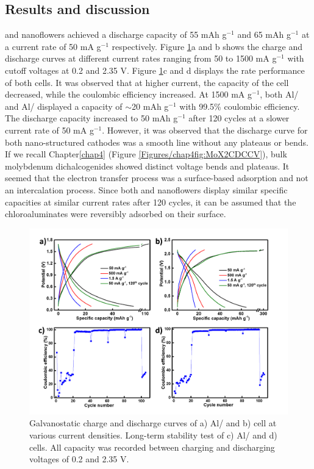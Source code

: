 \subsection{Results and discussion}
 and  nanoflowers achieved a discharge capacity of 55 mAh g$^{-1}$ and 65 mAh g$^{-1}$ at a current rate of 50 mA g$^{-1}$ respectively. Figure \ref{Figures/chap6fig:MoX2YNCDCsCEs}a and b shows the charge and discharge curves at different current rates ranging from 50 to 1500 mA g$^{-1}$ with cutoff voltages at 0.2 and 2.35 V. Figure \ref{Figures/chap6fig:MoX2YNCDCsCEs}c and d displays the rate performance of both cells. It was observed that at higher current, the capacity of the cell decreased, while the coulombic efficiency increased. At 1500 mA g$^{-1}$, both Al/ and Al/ displayed a capacity of $\sim$20 mAh g$^{-1}$ with 99.5\% coulombic efficiency. The discharge capacity increased to 50 mAh g$^{-1}$ after 120 cycles at a slower current rate of 50 mA g$^{-1}$. However, it was observed that the discharge curve for both nano-structured cathodes was a smooth line without any plateaus or bends. If we recall Chapter\ref{chap4} (Figure \ref{Figures/chap4fig:MoX2CDCCV}), bulk molybdenum dichalcogenides showed distinct voltage bends and plateaus. It seemed that the electron transfer process was a surface-based adsorption and not an intercalation process. Since both  and  nanoflowers display similar specific capacities at similar current rates after 120 cycles, it can be assumed that the chloroaluminates were reversibly adsorbed on their surface. 

\begin{figure}[h!]
  \centering
  \includegraphics[width=\textwidth]{Figures/chap6fig/MoX2YNCDCsCEs}
    \caption{Galvanostatic charge and discharge curves of a) Al/ and b)  cell at various current densities. Long-term stability test of c) Al/ and d)  cells. All capacity was recorded between charging and discharging voltages of 0.2 and 2.35 V.}
  \label{Figures/chap6fig:MoX2YNCDCsCEs}
\end{figure}

